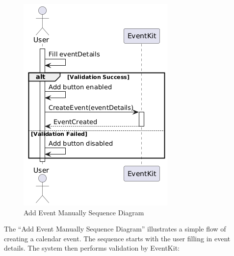 \begin{figure}[!h]
  \centering
  \includegraphics[width=\textwidth]{images/docs/diagrams/sequence-diagrams/all-sequence-diagrams/Add Event Manually.png}
  \caption{Add Event Manually Sequence Diagram}
  \label{fig:seq/add-event-manually}
\end{figure}

The ``Add Event Manually Sequence Diagram'' illustrates a simple flow of creating a calendar event. The sequence starts with the user filling in event details. The system then performs validation by EventKit:

